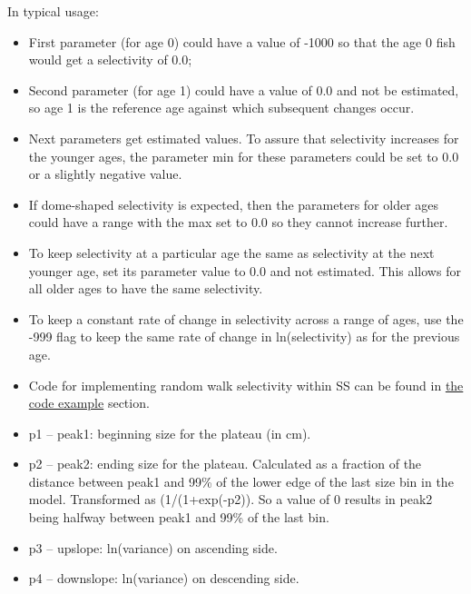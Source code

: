 In typical usage:
	\begin{itemize}
		\item First parameter (for age 0) could have a value of -1000 so that the age 0 fish would get a selectivity of 0.0;
		\item 	Second parameter (for age 1) could have a value of 0.0 and not be estimated, so age 1 is the reference age against which subsequent changes occur.
		\item 	Next parameters get estimated values.  To assure that selectivity increases for the younger ages, the parameter min for these parameters could be set to 0.0 or a slightly negative value.
		\item If dome-shaped selectivity is expected, then the parameters for older ages could have a range with the max set to 0.0 so they cannot increase further.
		\item To keep selectivity at a particular age the same as selectivity at the next younger age, set its parameter value to 0.0 and not estimated.  This allows for all older ages to have the same selectivity.
		\item 	To keep a constant rate of change in selectivity across a range of ages, use the -999 flag to keep the same rate of change in ln(selectivity) as for the previous age.
		\item  Code for implementing random walk selectivity within SS can be found in \hyperlink{RandWalkSelex}{the code example} section.
	\end{itemize}


	\begin{itemize}
		\item p1 – peak1: beginning size for the plateau (in cm).
		\item p2 – peak2: ending size for the plateau.  Calculated as a fraction of the distance between peak1 and 99\% of the lower edge of the last size bin in the model.  Transformed as (1/(1+exp(-p2)). So a value of 0 results in peak2 being halfway between peak1 and 99\% of the last bin.
		\item p3 – upslope: ln(variance) on ascending side.
		\item p4 – downslope:  ln(variance) on descending side.
	\end{itemize}


